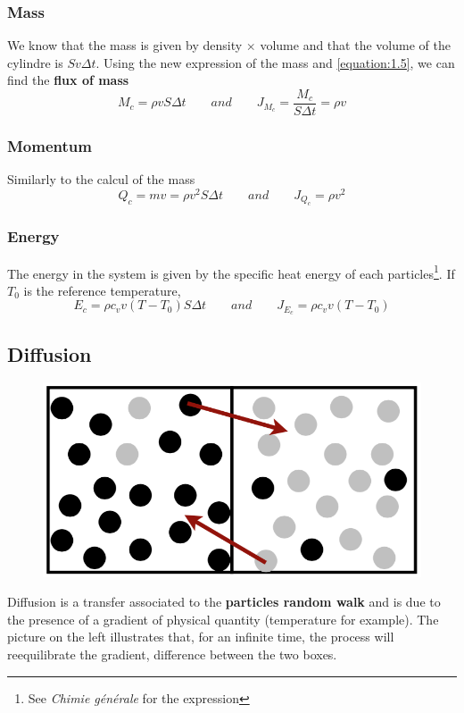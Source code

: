 \subsubsection{Mass}
We know that the mass is given by density $\times$ volume and that the volume of the cylindre is $Sv\Delta t$. Using the new expression of the mass and \eqref{equation:1.5}, we can find the \textbf{flux of mass} 
\begin{equation}
	M_c = \rho v S \Delta t \qquad and \qquad  J_{M_c} = \frac{M_c}{S\Delta t} = \rho v
\end{equation}
	
\subsubsection{Momentum}
Similarly to the calcul of the mass
\begin{equation}
	Q_c = mv = \rho v^2 S \Delta t \qquad and \qquad J_{Q_c} = \rho v^2
\end{equation}
	
\subsubsection{Energy}
The energy in the system is given by the specific heat energy of each particles\footnote{See \emph{Chimie générale} for the expression}. If $T_0$ is the reference temperature, 
\begin{equation}
	E_c = \rho c_v v (T-T_0) S \Delta t \qquad and \qquad J_{E_c} = \rho c_v v (T-T_0)
\end{equation}
	
\subsection{Diffusion}
\begin{figure}
	\vspace{-5mm}
	\includegraphics[scale=0.26]{ch1/3}
\end{figure}
Diffusion is a transfer associated to the \textbf{particles	random walk} and is due to the presence of a gradient of physical quantity (temperature for example). The picture on the left illustrates that, for an infinite time, the process will reequilibrate the gradient, difference between the two boxes.
	
